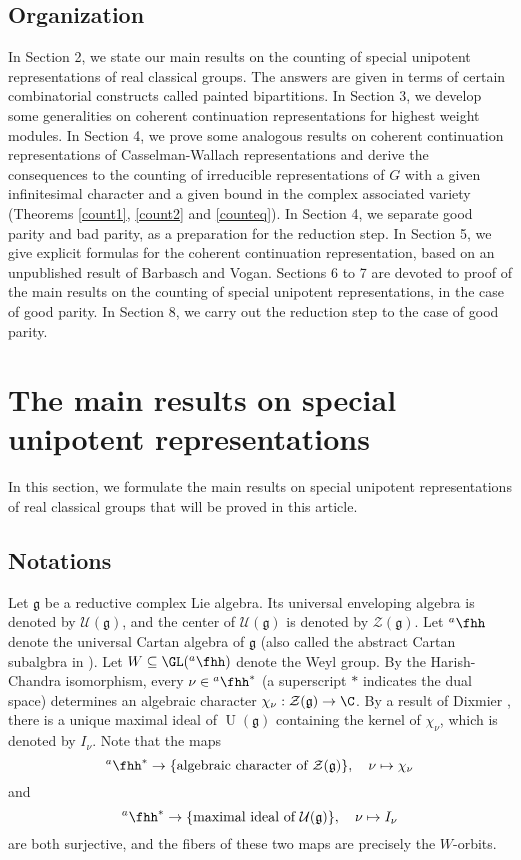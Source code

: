 \documentclass[12pt,a4paper]{amsart}
\def\subset{\subseteq}
\newcommand{\CU}{{\mathcal {U}}}
\newcommand{\CZ}{{\mathcal {Z}}}
\newcommand{\oU}{\operatorname{U}}
\newcommand{\g}{\mathfrak g}
\numberwithin{equation}{section}
\theoremstyle{remark}
\def\hha{{}^a\fhh}
\begin{document}
\subsection{Organization}
In Section 2, we state our main results on the counting of special unipotent representations of real classical groups. The answers are given in terms of certain combinatorial constructs called painted bipartitions. In Section 3, we develop some generalities on coherent continuation representations for highest weight modules. In Section 4, we prove some analogous results on coherent continuation representations of Casselman-Wallach representations and derive the consequences to the counting of irreducible representations of $G$ with a given infinitesimal character and a given bound in the complex associated variety (Theorems \ref{count1}, \ref{count2} and \ref{counteq}). In Section 4, we separate good parity and bad parity, as a preparation for the reduction step. In Section 5, we give explicit formulas for the coherent continuation representation, based on an unpublished result of Barbasch and Vogan. Sections 6 to 7 are devoted to proof of the main results on the counting of special unipotent representations, in the case of good parity. In Section 8, we carry out the reduction step to the case of good parity.




\section{The main results on special unipotent representations}

In this section, we formulate the main results on special unipotent representations of real classical groups that will be proved in this article.


\subsection{Notations}\label{secnot}

Let $\g$ be a reductive complex Lie algebra. Its universal enveloping algebra is denoted by
$\mathcal U(\g)$, and the center of $\mathcal U(\g)$ is denoted by $\CZ(\g)$. Let
 $\hha$ denote the  universal Cartan algebra of $\g$    (also called the abstract Cartan subalgbra in \cite{V4}). Let $W\subset \GL(\hha)$ denote the Weyl group.
 By the Harish-Chandra isomorphism, every $\nu \in \hha^*$ (a superscript $*$ indicates the dual space)
determines an algebraic character $\chi_\nu: \CZ(\g)\rightarrow \C$. By a result of Dixmier \cite[Section 3]{Bor}, there is a unique maximal ideal of $\oU(\g)$ containing the kernel of $\chi_\nu$, which is denoted by $I_\nu$.
Note that the maps
\[
  \hha^*\rightarrow \{\textrm{algebraic character of $\CZ(\g)$}\}, \quad \nu\mapsto \chi_\nu
\]
and
\[
  \hha^*\rightarrow \{\textrm{maximal ideal  of $\CU(\g)$}\}, \quad \nu\mapsto I_\nu
\]
are both surjective, and the fibers of these two maps are precisely the $W$-orbits.
\end{document}
